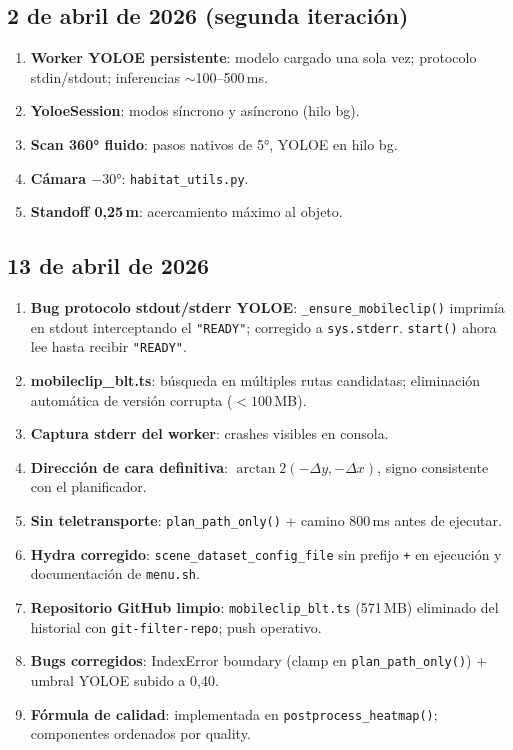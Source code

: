 \documentclass[11pt,a4paper]{article}
\begin{document}
\subsection*{2 de abril de 2026 (segunda iteración)}

\begin{enumerate}
  \item \textbf{Worker YOLOE persistente}: modelo cargado una sola vez; protocolo
        stdin/stdout; inferencias $\sim$100--500\,ms.
  \item \textbf{YoloeSession}: modos síncrono y asíncrono (hilo bg).
  \item \textbf{Scan 360° fluido}: pasos nativos de 5°, YOLOE en hilo bg.
  \item \textbf{Cámara $-30°$}: \texttt{habitat\_utils.py}.
  \item \textbf{Standoff 0,25\,m}: acercamiento máximo al objeto.
\end{enumerate}

\subsection*{13 de abril de 2026}

\begin{enumerate}
  \item \textbf{Bug protocolo stdout/stderr YOLOE}: \texttt{\_ensure\_mobileclip()}
        imprimía en stdout interceptando el \texttt{"READY"}; corregido a
        \texttt{sys.stderr}. \texttt{start()} ahora lee hasta recibir \texttt{"READY"}.
  \item \textbf{mobileclip\_blt.ts}: búsqueda en múltiples rutas candidatas;
        eliminación automática de versión corrupta (${<}100$\,MB).
  \item \textbf{Captura stderr del worker}: crashes visibles en consola.
  \item \textbf{Dirección de cara definitiva}: $\arctan2(-\Delta y, -\Delta x)$,
        signo consistente con el planificador.
  \item \textbf{Sin teletransporte}: \texttt{plan\_path\_only()} + camino 800\,ms
        antes de ejecutar.
  \item \textbf{Hydra corregido}: \texttt{scene\_dataset\_config\_file} sin prefijo
        \texttt{+} en ejecución y documentación de \texttt{menu.sh}.
  \item \textbf{Repositorio GitHub limpio}: \texttt{mobileclip\_blt.ts} (571\,MB)
        eliminado del historial con \texttt{git-filter-repo}; push operativo.
  \item \textbf{Bugs corregidos}: IndexError boundary (clamp en
        \texttt{plan\_path\_only()}) + umbral YOLOE subido a 0,40.
  \item \textbf{Fórmula de calidad}: implementada en \texttt{postprocess\_heatmap()};
        componentes ordenados por quality.
\end{enumerate}
\end{document}
